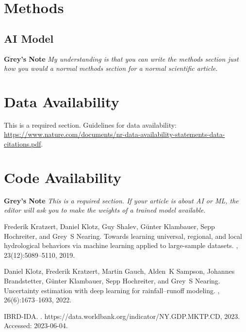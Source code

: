 \documentclass[pdflatex]{sn-jnl}
\begin{document}
\unnumbered
\section{Methods}
\subsection{AI Model}
\textbf{Grey's Note} \textit{My understanding is that you can write the methods section just how you would a normal methods section for a normal scientific article.}


\section*{Data Availability}
This is a required section. Guidelines for data availability: \url{https://www.nature.com/documents/nr-data-availability-statements-data-citations.pdf}.

\section*{Code Availability}
\textbf{Grey's Note} \textit{This is a required section. If your article is about AI or ML, the editor will ask you to make the weights of a trained model available.}


\newpage
\renewcommand\refname{Methods References}
\begin{thebibliography}{10}

Frederik Kratzert, Daniel Klotz, Guy Shalev, G{\"u}nter Klambauer, Sepp
  Hochreiter, and Grey~S Nearing.
\newblock Towards learning universal, regional, and local hydrological
  behaviors via machine learning applied to large-sample datasets.
, 23(12):5089--5110, 2019.

Daniel Klotz, Frederik Kratzert, Martin Gauch, Alden~K Sampson, Johannes
  Brandstetter, G{\"u}nter Klambauer, Sepp Hochreiter, and Grey~S Nearing.
\newblock Uncertainty estimation with deep learning for rainfall--runoff
  modeling.
, 26(6):1673--1693, 2022.

IBRD-IDA.
.
\newblock https://data.worldbank.org/indicator/NY.GDP.MKTP.CD, 2023.
\newblock Accessed: 2023-06-04.

\end{thebibliography}
\end{document}
